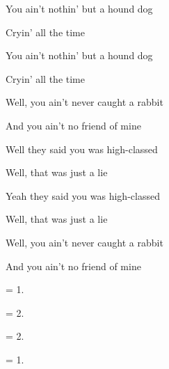 

\zs
You ain't nothin' but a hound dog

Cryin' all the time

You ain't nothin' but a hound dog

Cryin' all the time

Well, you ain't never caught a rabbit

And you ain't no friend of mine
\ks

\zs
Well they said you was high-classed
                    
Well, that was just a lie

Yeah they said you was high-classed

Well, that was just a lie

Well, you ain't never caught a rabbit

And you ain't no friend of mine
\ks

\zs
= 1.
\ks

\zs
= 2.
\ks

\zs
= 2.
\ks

\zs
= 1.
\ks

\kp
